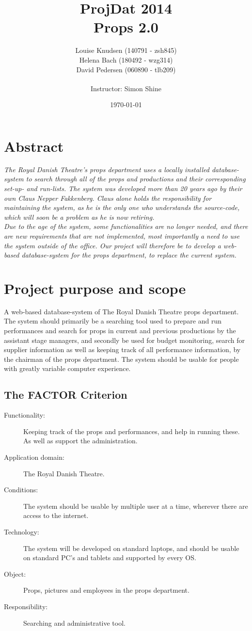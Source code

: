 \documentclass[12pt]{article}
\title{ProjDat 2014\\Props 2.0}
\author{Louise Knudsen (140791 - zsh845)\\
Helena Bach (180492 - wzg314)\\
David Pedersen (060890 - tlb209)\\\\
Instructor: Simon Shine }
\date{\today}
\begin{document}
\maketitle
\newpage
\section{Abstract}
\textit{The Royal Danish Theatre's props department uses a locally installed database-system to search through all of the props and productions and their corresponding set-up- and run-lists. The system was developed more than 20 years ago by their own Claus Nepper Fakkenberg. Claus alone holds the responsibility for maintaining the system, as he is the only one who understands the source-code, which will soon be a problem as he is now retiring. \\
Due to the age of the system, some functionalities are no longer needed, and there are new requirements that are not implemented, most importantly a need to use the system outside of the office. Our project will therefore be to develop a web-based database-system for the props department, to replace the current system.}
\section{Project purpose and scope}
A web-based database-system of The Royal Danish Theatre props department. The system should primarily be a searching tool used to prepare and run performances and search for props in current and previous productions by the assistant stage managers, and secondly be used for budget monitoring, search for supplier information as well as keeping track of all performance information, by the chairman of the props department. The system should be usable for people with greatly variable computer experience.
\subsection{The FACTOR Criterion}
\begin{description}
  \item[Functionality:] Keeping track of the props and performances, and help in running these. As well as support the administration.
  \item[Application domain:] The Royal Danish Theatre.
  \item[Conditions:] The system should be usable by multiple user at a time, wherever there are access to the internet.
  \item[Technology:] The system will be developed on standard laptops, and should be usable on standard PC's and tablets and supported by every OS.
  \item[Object:] Props, pictures and employees in the props department.
  \item[Responsibility:] Searching and administrative tool.
\end{description}
\end{document}
